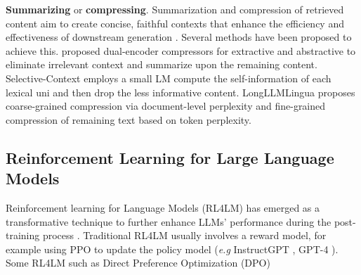 \textbf{Summarizing} or \textbf{compressing}. Summarization and compression of retrieved content aim to create concise, faithful contexts that enhance the efficiency and effectiveness of downstream generation \cite{xu2024recomp}. Several methods have been proposed to achieve this. \cite{xu2024recomp} proposed dual-encoder compressors for extractive and abstractive to eliminate irrelevant context and summarize upon the remaining content. Selective-Context \cite{li-etal-2023-compressing} employs a small LM  compute the self-information of each lexical uni and then drop the less informative content. LongLLMLingua \cite{jiang-etal-2024-longllmlingua} proposes coarse-grained compression via document-level perplexity and fine-grained compression of remaining text based on token perplexity. 
 
\subsection{Reinforcement Learning for Large Language Models}
Reinforcement learning for Language Models (RL4LM) has emerged as a transformative technique to further enhance LLMs' performance during the post-training process \cite{cao2024survey, pternea2024rl}. Traditional RL4LM usually involves a reward model, for example using PPO \cite{schulman2015high} to update the policy model (\emph{e.g} InstructGPT \cite{ouyang2022training}, GPT-4 \cite{achiam2023gpt}). Some RL4LM such as Direct Preference Optimization (DPO) \cite{rafailov2024direct}
